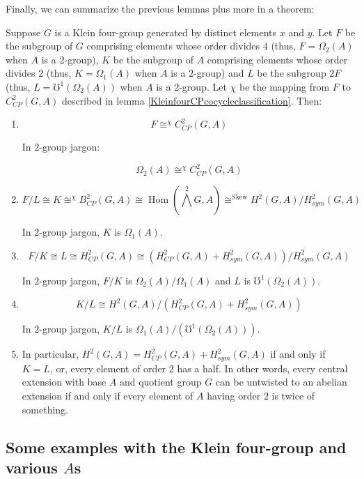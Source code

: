 \documentclass[10pt]{amsart}
\newcommand{\Skew}{\operatorname{Skew}}
\begin{document}
Finally, we can summarize the previous lemmas plus more in a
theorem:

\begin{theorem}\label{Kleinfoursummary}
  Suppose $G$ is a Klein four-group generated by distinct elements $x$
  and $y$. Let $F$ be the subgroup of $G$ comprising elements whose
  order divides $4$ (thus, $F = \Omega_2(A)$ when $A$ is a $2$-group),
  $K$ be the subgroup of $A$ comprising elements whose order divides
  $2$ (thus, $K = \Omega_1(A)$ when $A$ is a $2$-group) and $L$ be the
  subgroup $2F$ (thus, $L = \mho^1(\Omega_2(A))$ when $A$ is a
  $2$-group. Let $\chi$ be the mapping from $F$ to $C^2_{CP}(G,A)$
  described in lemma \ref{KleinfourCPcocycleclassification}. Then:

  \begin{enumerate}
  \item $$F \cong^{\chi} C^2_{CP}(G,A)$$

    In $2$-group jargon:

    $$\Omega_2(A) \cong^{\chi} C^2_{CP}(G,A)$$

  \item $$F/L \cong K \cong^{\chi} B^2_{CP}(G,A) \cong
    \operatorname{Hom}(\bigwedge^2G,A) \cong^{\Skew} H^2(G,A)/H^2_{sym}(G,A)$$

    In $2$-group jargon, $K$ is $\Omega_1(A)$.

  \item $$F/K \cong L \cong H^2_{CP}(G,A) \cong (H^2_{CP}(G,A) + H^2_{sym}(G,A))/H^2_{sym}(G,A)$$

    In $2$-group jargon, $F/K$ is $\Omega_2(A)/\Omega_1(A)$ and $L$ is
    $\mho^1(\Omega_2(A))$.
  \item $$K/L \cong H^2(G,A)/(H^2_{CP}(G,A) + H^2_{sym}(G,A))$$

    In $2$-group jargon, $K/L$ is $\Omega_1(A)/(\mho^1(\Omega_2(A)))$.
  \item In particular, $H^2(G,A) = H^2_{CP}(G,A) + H^2_{sym}(G,A)$ if
    and only if $K = L$, or, every element of order $2$ has a half. In
    other words, every central extension with base $A$ and quotient
    group $G$ can be untwisted to an abelian extension if and only if
    every element of $A$ having order $2$ is twice of something.
  \end{enumerate}
\end{theorem}

\subsection{Some examples with the Klein four-group and various $A$s}
\end{document}
